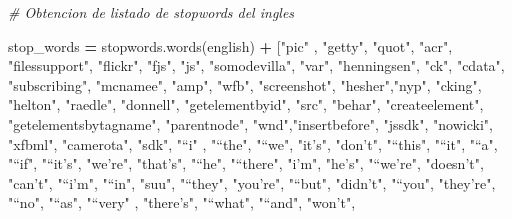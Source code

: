\documentclass[
  11pt,
  a4paper,
]{article}
\newenvironment{Shaded}{\begin{snugshade}}{\end{snugshade}}
\newcommand{\CommentTok}[1]{\textcolor[rgb]{0.56,0.35,0.01}{\textit{#1}}}
\newcommand{\NormalTok}[1]{#1}
\newcommand{\OperatorTok}[1]{\textcolor[rgb]{0.81,0.36,0.00}{\textbf{#1}}}
\newcommand{\StringTok}[1]{\textcolor[rgb]{0.31,0.60,0.02}{#1}}
\begin{document}
\begin{Shaded}
\begin{Highlighting}[]
\CommentTok{\# Obtencion de listado de stopwords del ingles}

\NormalTok{stop\_words }\OperatorTok{=}\NormalTok{ stopwords.words(}\StringTok{\textquotesingle{}english\textquotesingle{}}\NormalTok{) }\OperatorTok{+}\NormalTok{ [}\StringTok{"pic"}\NormalTok{ , }\StringTok{"getty"}\NormalTok{, }\StringTok{"quot"}\NormalTok{, }\StringTok{"acr"}\NormalTok{, }\StringTok{"filessupport"}\NormalTok{, }\StringTok{"flickr"}\NormalTok{, }\StringTok{"fjs"}\NormalTok{, }\StringTok{"js"}\NormalTok{, }\StringTok{"somodevilla"}\NormalTok{, }\StringTok{"var"}\NormalTok{, }\StringTok{"henningsen"}\NormalTok{,}
\StringTok{"ck"}\NormalTok{, }\StringTok{"cdata"}\NormalTok{, }\StringTok{"subscribing"}\NormalTok{, }\StringTok{"mcnamee"}\NormalTok{, }\StringTok{"amp"}\NormalTok{, }\StringTok{"wfb"}\NormalTok{, }\StringTok{"screenshot"}\NormalTok{, }\StringTok{"hesher"}\NormalTok{,}\StringTok{"nyp"}\NormalTok{, }\StringTok{"cking"}\NormalTok{, }\StringTok{"helton"}\NormalTok{, }\StringTok{"raedle"}\NormalTok{, }\StringTok{"donnell"}\NormalTok{,}
\StringTok{"getelementbyid"}\NormalTok{, }\StringTok{"src"}\NormalTok{, }\StringTok{"behar"}\NormalTok{, }\StringTok{"createelement"}\NormalTok{, }\StringTok{"getelementsbytagname"}\NormalTok{, }\StringTok{"parentnode"}\NormalTok{, }\StringTok{"wnd"}\NormalTok{,}\StringTok{"insertbefore"}\NormalTok{,}
\StringTok{"jssdk"}\NormalTok{, }\StringTok{"nowicki"}\NormalTok{, }\StringTok{"xfbml"}\NormalTok{, }\StringTok{"camerota"}\NormalTok{, }\StringTok{"sdk"}\NormalTok{,  }\StringTok{"“i"}\NormalTok{ , }\StringTok{"“the"}\NormalTok{, }\StringTok{"“we"}\NormalTok{, }\StringTok{"it’s"}\NormalTok{, }\StringTok{"don’t"}\NormalTok{, }\StringTok{"“this"}\NormalTok{, }\StringTok{"“it"}\NormalTok{, }\StringTok{"“a"}\NormalTok{,}
\StringTok{"“if"}\NormalTok{,  }\StringTok{"“it’s"}\NormalTok{, }\StringTok{"we’re"}\NormalTok{, }\StringTok{"that’s"}\NormalTok{,  }\StringTok{"“he"}\NormalTok{, }\StringTok{"“there"}\NormalTok{, }\StringTok{"i’m"}\NormalTok{,  }\StringTok{"he’s"}\NormalTok{,  }\StringTok{"“we’re"}\NormalTok{, }\StringTok{"doesn’t"}\NormalTok{, }\StringTok{"can’t"}\NormalTok{, }\StringTok{"“i’m"}\NormalTok{, }\StringTok{"“in"}\NormalTok{,}
\StringTok{"suu"}\NormalTok{, }\StringTok{"“they"}\NormalTok{, }\StringTok{"you’re"}\NormalTok{, }\StringTok{"“but"}\NormalTok{, }\StringTok{"didn’t"}\NormalTok{, }\StringTok{"“you"}\NormalTok{, }\StringTok{"they’re"}\NormalTok{, }\StringTok{"“no"}\NormalTok{, }\StringTok{"“as"}\NormalTok{, }\StringTok{"“very"}\NormalTok{ , }\StringTok{"there’s"}\NormalTok{, }\StringTok{"“what"}\NormalTok{,  }\StringTok{"“and"}\NormalTok{, }\StringTok{"won’t"}\NormalTok{,}

\end{Highlighting}
\end{Shaded}
\end{document}
